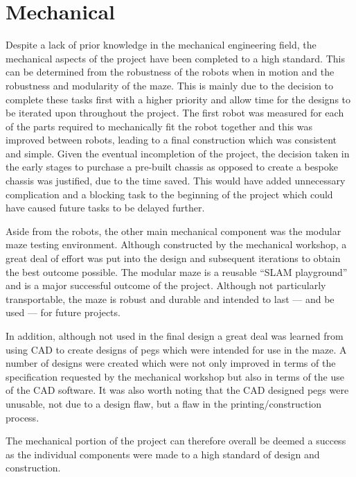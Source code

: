 \section{Mechanical}\label{eval/mech}
Despite a lack of prior knowledge in the mechanical engineering field, the 
mechanical aspects of the project have been completed to a 
high standard. This can be determined from the robustness of the robots when in 
motion and the robustness and modularity of the maze. This is mainly due to the 
decision to complete these tasks first with a higher priority and allow time for the 
designs to be iterated upon throughout the project. The first robot was measured for 
each of the parts required to mechanically fit the robot together and this was 
improved between robots, leading to a final construction which was consistent and 
simple. Given the eventual incompletion of the project, the decision taken in the 
early stages to purchase a pre-built chassis as opposed to create a bespoke chassis 
was justified, due to the time saved. This would have added unnecessary complication 
and a blocking task to the beginning of the project which could have caused future 
tasks to be delayed further. 

Aside from the robots, the other main mechanical component was the modular maze 
testing environment. Although constructed by the mechanical workshop, a great deal of 
effort was put into the design and subsequent iterations to obtain the best outcome 
possible. The modular maze is a reusable ``SLAM playground'' and is a major 
successful outcome of the project. Although not particularly transportable, the maze 
is robust and durable and intended to last --- and be used --- for future projects.

In addition, although not used in the final design a great deal was learned from 
using CAD to create designs of pegs which were intended for use in the maze. A number 
of designs were created which were not only improved in terms of the specification 
requested by the mechanical workshop but also in terms of the use of the CAD 
software. It was also worth noting that the CAD designed pegs were unusable, not due 
to a design flaw, but a flaw in the printing/construction process.  

The mechanical portion of the project can therefore overall be deemed a success as 
the individual components were made to a high standard of design and construction. 

